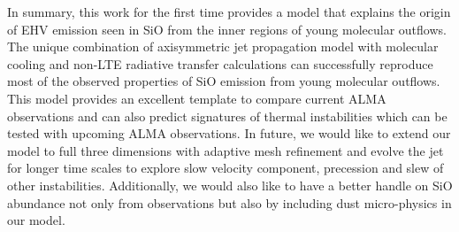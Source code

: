 \documentclass[useAMS,usenatbib]{mn2e}
\begin{document}
In summary, this work for the first time provides a model
that explains the origin of EHV emission seen in SiO from 
the inner regions of young molecular outflows. The unique combination
of axisymmetric jet propagation model with molecular cooling and
non-LTE radiative transfer calculations can successfully reproduce most
of the observed properties of SiO emission from young molecular
outflows. This model provides an excellent
template to compare current ALMA observations and can also predict
signatures of thermal instabilities which can be tested with upcoming
ALMA observations. In future, we would like to extend our
model to full three dimensions with adaptive mesh refinement
and evolve the jet for longer time scales to explore slow velocity 
component, precession and slew of other instabilities. Additionally, we would also like to have
a better handle on SiO abundance not only from observations but also
by including dust micro-physics in our model. 






\label{lastpage}
\end{document}
